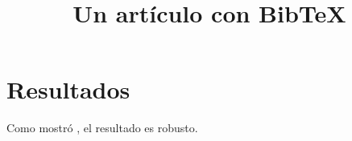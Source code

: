 \documentclass{article}
\title{Un artículo con BibTeX}
\begin{document}
\maketitle
\section{Resultados}
Como mostró \cite{knuth1984}, el resultado es robusto.


\end{document}
